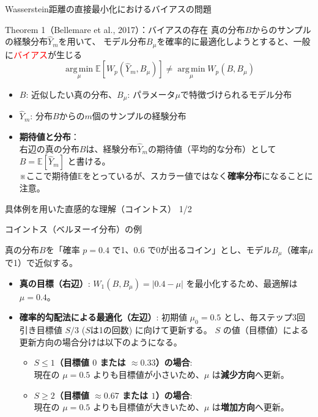 \documentclass[aspectratio=169, dvipdfmx, 11pt]{beamer}
\newcommand{\red}[1]{\textcolor{red}{#1}}
\begin{document}
\begin{frame}{Wasserstein距離の直接最小化におけるバイアスの問題}
  \begin{alertblock}{Theorem 1（Bellemare et al., 2017）：バイアスの存在}
    {\small
    真の分布$B$からのサンプルの経験分布$\hat{Y}_m$を用いて、
    モデル分布$B_\mu$を確率的に最適化しようとすると、一般に\red{バイアス}が生じる
    \vspace{-4pt}
    \[
      \operatorname*{arg\,min}_\mu \mathbb{E}\!\left[W_p(\hat{Y}_m, B_\mu)\right]
      \neq \operatorname*{arg\,min}_\mu W_p(B, B_\mu)
    \]
    \vspace{-4pt}
    }
  \end{alertblock}
  \begin{itemize}\setlength{\itemsep}{2pt}
    \item {\small $B$: 近似したい真の分布、$B_\mu$: パラメータ$\mu$で特徴づけられるモデル分布}
    \item {\small $\hat{Y}_m$: 分布$B$からの$m$個のサンプルの経験分布}
    \item {\small \textbf{期待値と分布}：\\
      右辺の真の分布$B$は、経験分布$\hat{Y}_m$の期待値（平均的な分布）として $B = \mathbb{E}[\hat{Y}_m]$ と書ける。\\
      ※ここで期待値$\mathbb{E}$をとっているが、スカラー値ではなく\textbf{確率分布}になることに注意。}
  \end{itemize}
\end{frame}

\begin{frame}{具体例を用いた直感的な理解（コイントス） 1/2}
  \begin{block}{コイントス（ベルヌーイ分布）の例}
    {\small
    真の分布$B$を「確率 $p=0.4$ で1、$0.6$ で0が出るコイン」とし、モデル$B_\mu$（確率$\mu$で1）で近似する。
    \begin{itemize}\setlength{\itemsep}{3pt}
      \item \textbf{真の目標（右辺）}: $W_1(B, B_\mu) = |0.4 - \mu|$ を最小化するため、最適解は \textbf{$\mu = 0.4$}。
      \item \textbf{確率的勾配法による最適化（左辺）}:
      初期値 \textbf{$\mu_0 = 0.5$} とし、毎ステップ3回引き目標値 $S/3$ ($S$は1の回数) に向けて更新する。
      $S$ の値（目標値）による更新方向の場合分けは以下のようになる。
      \begin{itemize}\setlength{\itemsep}{2pt}
        \item \textbf{$S \le 1$（目標値 $0$ または $\approx 0.33$）の場合}:\\
        現在の $\mu=0.5$ よりも目標値が小さいため、$\mu$ は\textbf{減少方向}へ更新。
        \item \textbf{$S \ge 2$（目標値 $\approx 0.67$ または $1$）の場合}:\\
        現在の $\mu=0.5$ よりも目標値が大きいため、$\mu$ は\textbf{増加方向}へ更新。
      \end{itemize}
    \end{itemize}
    }
  \end{block}
\end{frame}
\end{document}
